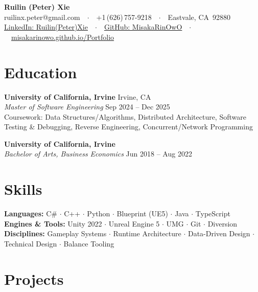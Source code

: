 \documentclass[letterpaper,10pt]{article}
\begin{document}
\pagestyle{empty}

\begin{center}
  {\LARGE\bfseries Ruilin (Peter) Xie}\\[4pt]
  ruilinx.peter@gmail.com\ \ $\cdot$\ \
  +1\,(626)\,757-9218\ \ $\cdot$\ \
  Eastvale, CA\ 92880\\[2pt]
  \href{https://www.linkedin.com/in/ruilin-xie-a926aa249/}{LinkedIn: Ruilin(Peter)Xie}\ \ $\cdot$\ \
  \href{https://github.com/MisakaRinOwO}{GitHub: MisakaRinOwO}\ \ $\cdot$\ \
  \href{https://misakarinowo.github.io/Portfolio}{misakarinowo.github.io/Portfolio}
\end{center}

\section{Education}

\textbf{University of California, Irvine} \hfill Irvine, CA\\
\textit{Master of Software Engineering} \hfill Sep 2024 -- Dec 2025\\
Coursework: Data Structures/Algorithms, Distributed Architecture, Software Testing \& Debugging, Reverse Engineering, Concurrent/Network Programming

\smallskip
\textbf{University of California, Irvine}\\
\textit{Bachelor of Arts, Business Economics} \hfill Jun 2018 -- Aug 2022

\section{Skills}

\textbf{Languages:} C\# $\cdot$ C++ $\cdot$ Python $\cdot$ Blueprint (UE5) $\cdot$ Java $\cdot$ TypeScript\\
\textbf{Engines \& Tools:} Unity 2022 $\cdot$ Unreal Engine 5 $\cdot$ UMG $\cdot$ Git $\cdot$ Diversion\\
\textbf{Disciplines:} Gameplay Systems $\cdot$ Runtime Architecture $\cdot$ Data-Driven Design $\cdot$ Technical Design $\cdot$ Balance Tooling

\section{Projects}
\end{document}
